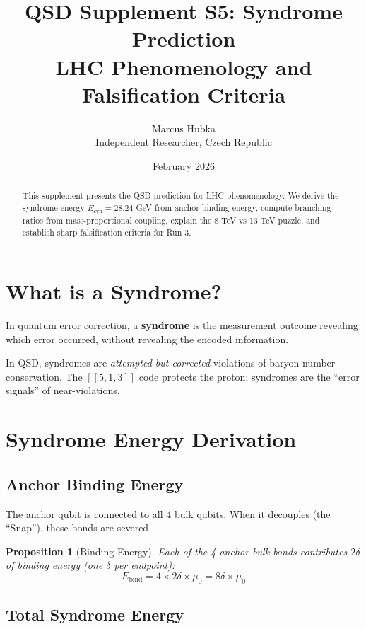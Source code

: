 \documentclass[11pt,a4paper]{article}
\title{\textbf{QSD Supplement S5: Syndrome Prediction}\\[0.5em]
\large LHC Phenomenology and Falsification Criteria}
\author{Marcus Hubka\\
\small Independent Researcher, Czech Republic}
\date{February 2026}
\newtheorem{proposition}[theorem]{Proposition}
\theoremstyle{definition}
\newcommand{\dgeo}{\delta}
\newcommand{\murad}{\mu_0}
\newcommand{\Esyn}{E_{\text{syn}}}
\begin{document}
\maketitle

\begin{abstract}
This supplement presents the QSD prediction for LHC phenomenology. We derive the syndrome energy $\Esyn = 28.24$ GeV from anchor binding energy, compute branching ratios from mass-proportional coupling, explain the 8 TeV vs 13 TeV puzzle, and establish sharp falsification criteria for Run 3.
\end{abstract}

\tableofcontents

\section{What is a Syndrome?}

In quantum error correction, a \textbf{syndrome} is the measurement outcome revealing which error occurred, without revealing the encoded information.

In QSD, syndromes are \emph{attempted but corrected} violations of baryon number conservation. The $[[5,1,3]]$ code protects the proton; syndromes are the ``error signals'' of near-violations.

\section{Syndrome Energy Derivation}

\subsection{Anchor Binding Energy}

The anchor qubit is connected to all 4 bulk qubits. When it decouples (the ``Snap''), these bonds are severed.

\begin{proposition}[Binding Energy]
Each of the 4 anchor-bulk bonds contributes $2\dgeo$ of binding energy (one $\dgeo$ per endpoint):
\begin{equation}
E_{\text{bind}} = 4 \times 2\dgeo \times \murad = 8\dgeo \times \murad
\end{equation}
\end{proposition}

\subsection{Total Syndrome Energy}
\end{document}
